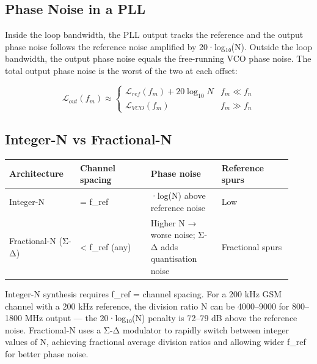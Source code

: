 \subsection{Phase Noise in a PLL}

      

Inside the loop bandwidth, the PLL output tracks the reference and the output phase noise follows the reference noise amplified by 20·log₁₀(N). Outside the loop bandwidth, the output phase noise equals the free-running VCO phase noise. The total output phase noise is the worst of the two at each offset:


      
\[\mathcal{L}_{out}(f_m) \approx \begin{cases}\mathcal{L}_{ref}(f_m) + 20\log_{10}N & f_m \ll f_n \\ \mathcal{L}_{VCO}(f_m) & f_m \gg f_n\end{cases}\]

      

\subsection{Integer-N vs Fractional-N}

      
        
        
        
      

{\small\begin{longtable}{>{\raggedright\arraybackslash}p{0.230\linewidth}>{\raggedright\arraybackslash}p{0.230\linewidth}>{\raggedright\arraybackslash}p{0.230\linewidth}>{\raggedright\arraybackslash}p{0.230\linewidth}}
\hline
\textbf{Architecture} & \textbf{Channel spacing} & \textbf{Phase noise} & \textbf{Reference spurs} \\
\hline
Integer-N & = f\_ref & 20·log(N) above reference noise & Low \\
Fractional-N (Σ-Δ) & \textless{} f\_ref (any) & Higher N → worse noise; Σ-Δ adds quantisation noise & Fractional spurs \\
\hline
\end{longtable}}

      

Integer-N synthesis requires f\_ref = channel spacing. For a 200 kHz GSM channel with a 200 kHz reference, the division ratio N can be 4000–9000 for 800–1800 MHz output — the 20·log₁₀(N) penalty is 72–79 dB above the reference noise. Fractional-N uses a Σ-Δ modulator to rapidly switch between integer values of N, achieving fractional average division ratios and allowing wider f\_ref for better phase noise.

